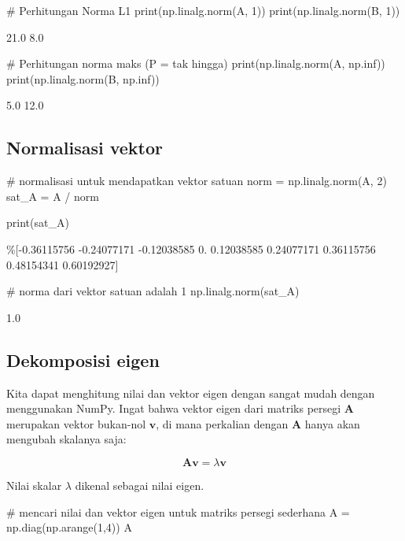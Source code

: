 \begin{pyin}
# Perhitungan Norma L1
print(np.linalg.norm(A, 1))
print(np.linalg.norm(B, 1))
\end{pyin}

\begin{pyout}
21.0
8.0
\end{pyout}

\begin{pyin}
# Perhitungan norma maks (P = tak hingga)
print(np.linalg.norm(A, np.inf))
print(np.linalg.norm(B, np.inf))
\end{pyin}

\begin{pyout}
5.0
12.0
\end{pyout}

\subsection{Normalisasi vektor}
\begin{pyin}
# normalisasi untuk mendapatkan vektor satuan
norm = np.linalg.norm(A, 2)
sat_A = A / norm

print(sat_A)
\end{pyin}

\begin{pyout}
\%[-0.36115756 -0.24077171 -0.12038585  0.          0.12038585  0.24077171
  0.36115756  0.48154341  0.60192927]
\end{pyout}

\begin{pyin}
# norma dari vektor satuan adalah 1
np.linalg.norm(sat_A)
\end{pyin}

\begin{pyout}
1.0
\end{pyout}

\subsection{Dekomposisi eigen}
Kita dapat menghitung nilai dan vektor eigen dengan sangat mudah dengan menggunakan NumPy. Ingat bahwa vektor eigen dari matriks persegi $\mathbf{A}$ merupakan vektor bukan-nol $\mathbf{v}$, di mana perkalian dengan $\mathbf{A}$ hanya akan mengubah skalanya saja:

$$\mathbf{Av} = \lambda \mathbf{v}$$

Nilai skalar $\lambda$ dikenal sebagai nilai eigen.

\begin{pyin}
# mencari nilai dan vektor eigen untuk matriks persegi sederhana
A = np.diag(np.arange(1,4))
A
\end{pyin}

